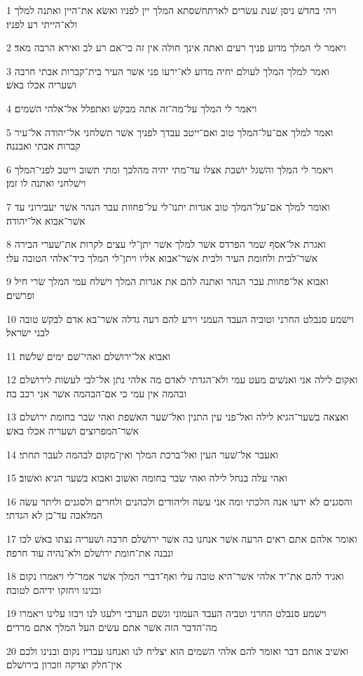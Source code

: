 \par 1 ויהי בחדשׁ ניסן שׁנת עשׂרים לארתחשׁסתא המלך יין לפניו ואשׂא את־היין ואתנה למלך ולא־הייתי רע לפניו׃
\par 2 ויאמר לי המלך מדוע פניך רעים ואתה אינך חולה אין זה כי־אם רע לב ואירא הרבה מאד׃
\par 3 ואמר למלך המלך לעולם יחיה מדוע לא־ירעו פני אשׁר העיר בית־קברות אבתי חרבה ושׁעריה אכלו באשׁ׃
\par 4 ויאמר לי המלך על־מה־זה אתה מבקשׁ ואתפלל אל־אלהי השׁמים׃
\par 5 ואמר למלך אם־על־המלך טוב ואם־ייטב עבדך לפניך אשׁר תשׁלחני אל־יהודה אל־עיר קברות אבתי ואבננה׃
\par 6 ויאמר לי המלך והשׁגל יושׁבת אצלו עד־מתי יהיה מהלכך ומתי תשׁוב וייטב לפני־המלך וישׁלחני ואתנה לו זמן׃
\par 7 ואומר למלך אם־על־המלך טוב אגרות יתנו־לי על־פחוות עבר הנהר אשׁר יעבירוני עד אשׁר־אבוא אל־יהודה׃
\par 8 ואגרת אל־אסף שׁמר הפרדס אשׁר למלך אשׁר יתן־לי עצים לקרות את־שׁערי הבירה אשׁר־לבית ולחומת העיר ולבית אשׁר־אבוא אליו ויתן־לי המלך כיד־אלהי הטובה עלי׃
\par 9 ואבוא אל־פחוות עבר הנהר ואתנה להם את אגרות המלך וישׁלח עמי המלך שׂרי חיל ופרשׁים׃
\par 10 וישׁמע סנבלט החרני וטוביה העבד העמני וירע להם רעה גדלה אשׁר־בא אדם לבקשׁ טובה לבני ישׂראל׃
\par 11 ואבוא אל־ירושׁלם ואהי־שׁם ימים שׁלשׁה׃
\par 12 ואקום לילה אני ואנשׁים מעט עמי ולא־הגדתי לאדם מה אלהי נתן אל־לבי לעשׂות לירושׁלם ובהמה אין עמי כי אם־הבהמה אשׁר אני רכב בה׃
\par 13 ואצאה בשׁער־הגיא לילה ואל־פני עין התנין ואל־שׁער האשׁפת ואהי שׂבר בחומת ירושׁלם אשׁר־המפרוצים ושׁעריה אכלו באשׁ׃
\par 14 ואעבר אל־שׁער העין ואל־ברכת המלך ואין־מקום לבהמה לעבר תחתי׃
\par 15 ואהי עלה בנחל לילה ואהי שׂבר בחומה ואשׁוב ואבוא בשׁער הגיא ואשׁוב׃
\par 16 והסגנים לא ידעו אנה הלכתי ומה אני עשׂה וליהודים ולכהנים ולחרים ולסגנים וליתר עשׂה המלאכה עד־כן לא הגדתי׃
\par 17 ואומר אלהם אתם ראים הרעה אשׁר אנחנו בה אשׁר ירושׁלם חרבה ושׁעריה נצתו באשׁ לכו ונבנה את־חומת ירושׁלם ולא־נהיה עוד חרפה׃
\par 18 ואגיד להם את־יד אלהי אשׁר־היא טובה עלי ואף־דברי המלך אשׁר אמר־לי ויאמרו נקום ובנינו ויחזקו ידיהם לטובה׃
\par 19 וישׁמע סנבלט החרני וטביה העבד העמוני וגשׁם הערבי וילעגו לנו ויבזו עלינו ויאמרו מה־הדבר הזה אשׁר אתם עשׂים העל המלך אתם מרדים׃
\par 20 ואשׁיב אותם דבר ואומר להם אלהי השׁמים הוא יצליח לנו ואנחנו עבדיו נקום ובנינו ולכם אין־חלק וצדקה וזכרון בירושׁלם׃

